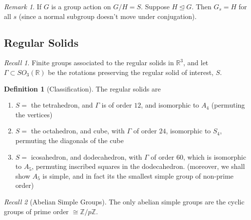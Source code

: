 \documentclass[12pt]{article}
\theoremstyle{definition}
\newtheorem{defn}[thm]{Definition}
\theoremstyle{remark}
\newtheorem{rmk}[thm]{Remark}
\newtheorem*{rec}{Recall}
\numberwithin{equation}{section}
\newcommand\R{\mathbb R}    %
\newcommand\Z{\mathbb Z}    %
\newcommand\nsub{\trianglelefteq}
\begin{document}
\vspace{15pt}

\begin{rmk}
        If $G$ is a group action on $G/H = S$. Suppose $H \nsub G$. Then $G_s =H$ for all $s$ (since a normal subgroup doesn't move under conjugation).
\end{rmk}


\subsection{Regular Solids}

\begin{rec}
        Finite groups associated to the regular solids in $\R^3$, and let $\Gamma \subset SO_3(\R)$ be the rotations preserving the regular solid of interest, $S$.
\end{rec}

\vspace{15pt}

\begin{defn}[Classification]
        The regular solids are \begin{enumerate}
                \item $S =$ the tetrahedron, and $\Gamma$ is of order $12$, and isomorphic to $A_4$ (permuting the vertices)
                \item $S =$ the octahedron, and cube, with $\Gamma$ of order $24$, isomorphic to $S_4$, permuting the diagonals of the cube
                \item $S =$ icosahedron, and dodecahedron, with $\Gamma$ of order $60$, which is isomorphic to $A_5$, permuting inscribed squares in the dodecahedron. (moreover, we shall show $A_5$ is simple, and in fact its the smallest simple group of non-prime order)
        \end{enumerate}
\end{defn}

\vspace{15pt}


\begin{rec}[Abelian Simple Groups]
        The only abelian simple groups are the cyclic groups of prime order $\cong \Z/p\Z$.
\end{rec}

\vspace{15pt}
\end{document}
